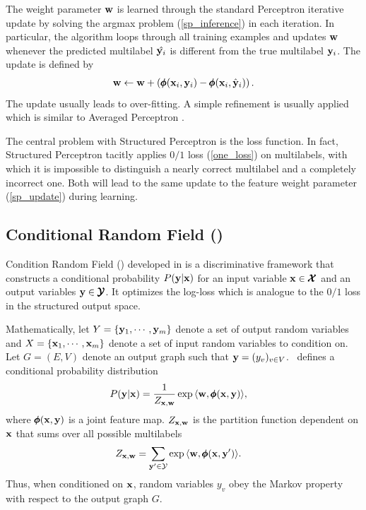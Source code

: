 {The weight parameter $\mathbf {w}$ is learned through the standard Perceptron iterative update by solving the argmax problem (\ref{sp_inference}) in each iteration.
In particular, the algorithm loops through all training examples and updates $\mathbf {w}$ whenever the predicted multilabel $\hat{\mathbf {y}_i}$ is different from the true multilabel $\mathbf {y}_i$.
The update is defined by
\begin{align}
	\mathbf {w} \leftarrow \mathbf {w} + \left(\pmb \phi(\mathbf {x}_i,\mathbf {y}_i) - \pmb \phi(\mathbf {x}_i,\hat{\mathbf {y}}_i)\right). \label{sp_update}
\end{align}
The update usually leads to over-fitting.
A simple refinement is usually applied which is similar to Averaged Perceptron \citep{Freund99large}.

The central problem with Structured Perceptron is the loss function.
In fact, Structured Perceptron tacitly applies $0/1$ loss (\ref{one_loss}) on multilabels, with which it is impossible to distinguish a nearly correct multilabel and a completely incorrect one.
Both will lead to the same update to the feature weight parameter (\ref{sp_update}) during learning.


%
% 
\subsection{Conditional Random Field (\crf)} \label{sc_crf}

Condition Random Field (\crf) developed in \citep{lafferty01,taskar02} is a discriminative framework that constructs a conditional probability $P(\mathbf {y}|\mathbf {x})$ for an input variable $\mathbf {x}\in\pmb {\mathcal{X}}$ and an output variables $\mathbf {y}\in\pmb {\mathcal{Y}}$.
It optimizes the log-loss which is analogue to the $0/1$ loss in the structured output space.

Mathematically, let $Y=\{\mathbf {y}_1,\cdots,\mathbf {y}_m\}$ denote a set of output random variables and $X=\{\mathbf {x}_1,\cdots,\mathbf {x}_m\}$ denote a set of input random variables to condition on.
Let $G=(E,V)$ denote an output graph such that $\mathbf {y} = (y_v)_{v\in V}$.
\crf\ defines a conditional probability distribution
\begin{align*}
	P(\mathbf {y}|\mathbf {x}) &= \frac{1}{Z_{\mathbf {x},\mathbf {w}}}\exp{\langle \mathbf {w}, \pmb \phi(\mathbf {x},\mathbf {y}) \rangle},
\end{align*}
where $\pmb \phi(\mathbf {x},\mathbf {y})$ is a joint feature map. 
$Z_{\mathbf {x},\mathbf {w}}$ is the partition function dependent on $\mathbf {x}$ that sums over all possible multilabels 
\begin{align}
	Z_{\mathbf {x},\mathbf {w}} &= \sum_{\mathbf {y}'\in\mathcal{Y}}\exp{\langle \mathbf {w}, \pmb \phi(\mathbf {x},\mathbf {y}') \rangle}. \label{crf_partition_function}
\end{align}
Thus, when conditioned on $\mathbf {x}$, random variables $y_v$ obey the Markov property with respect to the output graph $G$.

}
